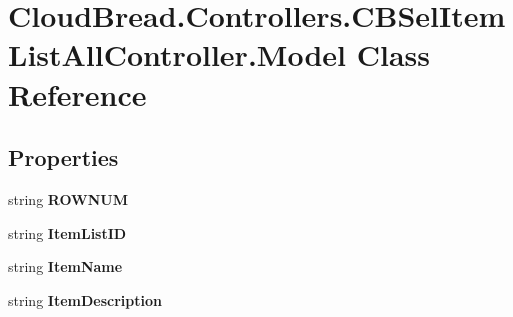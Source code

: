 \hypertarget{class_cloud_bread_1_1_controllers_1_1_c_b_sel_item_list_all_controller_1_1_model}{}\section{Cloud\+Bread.\+Controllers.\+C\+B\+Sel\+Item\+List\+All\+Controller.\+Model Class Reference}
\label{class_cloud_bread_1_1_controllers_1_1_c_b_sel_item_list_all_controller_1_1_model}
\subsection*{Properties}
\begin{DoxyCompactItemize}
\item 
string {\bfseries R\+O\+W\+N\+UM}\hypertarget{class_cloud_bread_1_1_controllers_1_1_c_b_sel_item_list_all_controller_1_1_model_ae77b3b9516ed5a467f9b909663d683fb}{}\label{class_cloud_bread_1_1_controllers_1_1_c_b_sel_item_list_all_controller_1_1_model_ae77b3b9516ed5a467f9b909663d683fb}

\item 
string {\bfseries Item\+List\+ID}\hypertarget{class_cloud_bread_1_1_controllers_1_1_c_b_sel_item_list_all_controller_1_1_model_a73d0ab04cee0c474269c6adb152e7cfb}{}\label{class_cloud_bread_1_1_controllers_1_1_c_b_sel_item_list_all_controller_1_1_model_a73d0ab04cee0c474269c6adb152e7cfb}

\item 
string {\bfseries Item\+Name}\hypertarget{class_cloud_bread_1_1_controllers_1_1_c_b_sel_item_list_all_controller_1_1_model_a00784c57054e10e5921f5c493bba62d4}{}\label{class_cloud_bread_1_1_controllers_1_1_c_b_sel_item_list_all_controller_1_1_model_a00784c57054e10e5921f5c493bba62d4}

\item 
string {\bfseries Item\+Description}\hypertarget{class_cloud_bread_1_1_controllers_1_1_c_b_sel_item_list_all_controller_1_1_model_a798eb2bb9d59cb9a963f2ae010f7be05}{}\label{class_cloud_bread_1_1_controllers_1_1_c_b_sel_item_list_all_controller_1_1_model_a798eb2bb9d59cb9a963f2ae010f7be05}


\end{DoxyCompactItemize}

